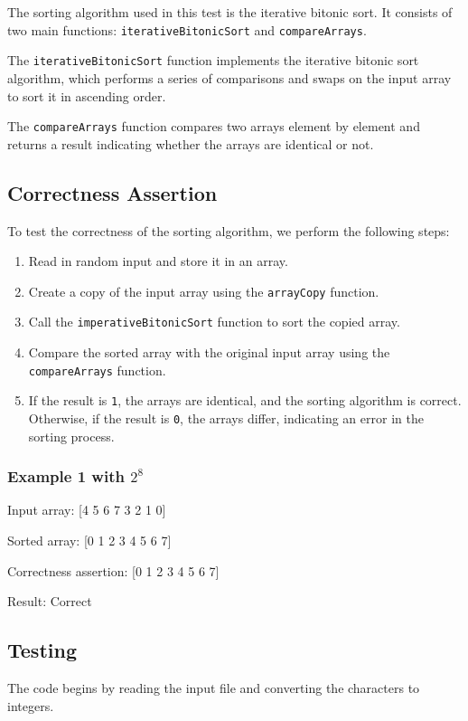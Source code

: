 The sorting algorithm used in this test is the iterative bitonic sort. It consists of two main functions: \texttt{iterativeBitonicSort} and \texttt{compareArrays}.

The \texttt{iterativeBitonicSort} function implements the iterative bitonic sort algorithm, which performs a series of comparisons and swaps on the input array to sort it in ascending order.

The \texttt{compareArrays} function compares two arrays element by element and returns a result indicating whether the arrays are identical or not.

\subsection*{Correctness Assertion}

To test the correctness of the sorting algorithm, we perform the following steps:

\begin{enumerate}
  \item Read in random input and store it in an array.
  \item Create a copy of the input array using the \texttt{arrayCopy} function.
  \item Call the \texttt{imperativeBitonicSort} function to sort the copied array.
  \item Compare the sorted array with the original input array using the \texttt{compareArrays} function.
  \item If the result is \texttt{1}, the arrays are identical, and the sorting algorithm is correct. Otherwise, if the result is \texttt{0}, the arrays differ, indicating an error in the sorting process.
\end{enumerate}

\subsubsection*{Example 1 with $2^8$}

Input array: [4 5 6 7 3 2 1 0]

Sorted array: [0 1 2 3 4 5 6 7]

Correctness assertion: [0 1 2 3 4 5 6 7]

Result: Correct
\subsection*{Testing}

The code begins by reading the input file and converting the characters to integers. 

